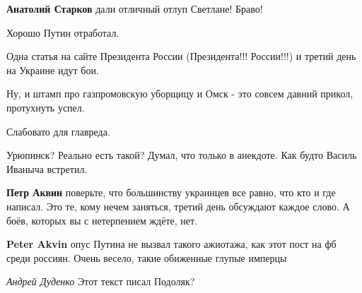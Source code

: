 \begin{itemize}
\begin{itemize}
 
\textbf{Анатолий Старков} дали отличный отлуп Светлане! Браво!
\end{itemize}

 

Хорошо Путин отработал.

Одна статья на сайте Президента России (Президента!!! России!!!) и третий день на Украине идут бои.

Ну, и штамп про газпромовскую уборщицу и Омск - это совсем давний прикол, протухнуть успел.

Слабовато для главреда.

\begin{itemize}
 
Урюпинск? Реально есть такой? Думал, что только в анекдоте. Как будто Василь Иваныча встретил.

 
\textbf{Петр Аквин} поверьте, что большинству украинцев все равно, что кто и где написал. Это те, кому нечем заняться, третий день обсуждают каждое слово. А боёв, которых вы с нетерпением ждёте, нет.

 
\textbf{Peter Akvin} опус Путина не вызвал такого ажиотажа, как этот пост на фб среди россиян. Очень весело, такие обиженные глупые имперцы
\end{itemize}

\emph{Андрей Дуденко}
Этот текст писал Подоляк?

\begin{itemize}
\end{itemize}

\end{itemize}

